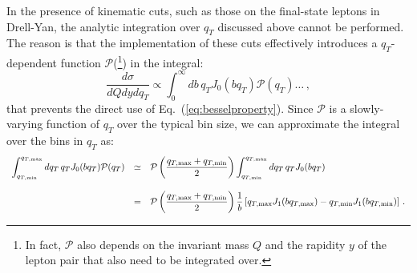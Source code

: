 \documentclass[10pt,a4paper]{article}
\begin{document}
In the presence of kinematic cuts, such as those on the final-state
leptons in Drell-Yan, the analytic integration over $q_T$ discussed
above cannot be performed. The reason is that the implementation of
these cuts effectively introduces a $q_T$-dependent function
$\mathcal{P}$(\footnote{In fact, $\mathcal{P}$ also depends on the
  invariant mass $Q$ and the rapidity $y$ of the lepton pair that also
  need to be integrated over.}) in the integral:
\begin{equation}
  \frac{d\sigma}{dQ dy dq_T} \propto \int_0^\infty db\, q_T  J_0(bq_T)\mathcal{P}(q_T)\dots\,,
\end{equation}
that prevents the direct use of Eq.~(\ref{eq:besselproperty}).
Since $\mathcal{P}$ is a slowly-varying function of $q_T$ over the
typical bin size, we can approximate the integral over the bins in
$q_T$ as:
\begin{equation}\label{eq:intbyparts}
\begin{array}{rcl}
\displaystyle  \int_{q_{T,\rm min}}^{q_{T,\rm
      max}} dq_T\, q_T J_0(bq_T) \mathcal{P}(q_T)&\simeq&\displaystyle
  \mathcal{P}\left(\frac{q_{T,\rm max}+q_{T,\rm min}}2\right)\int_{q_{T,\rm min}}^{q_{T,\rm
      max}} dq_T\, q_T J_0(bq_T) \\
\\
&=& \displaystyle\mathcal{P}\left(\frac{q_{T,\rm max}+q_{T,\rm
    min}}2\right) \frac{1}{b}\left[q_{T,\rm max} J_1(bq_{T,\rm max}) - q_{T,\rm min} J_1(bq_{T,\rm min}) \right]\,.
\end{array}
\end{equation}
\end{document}
